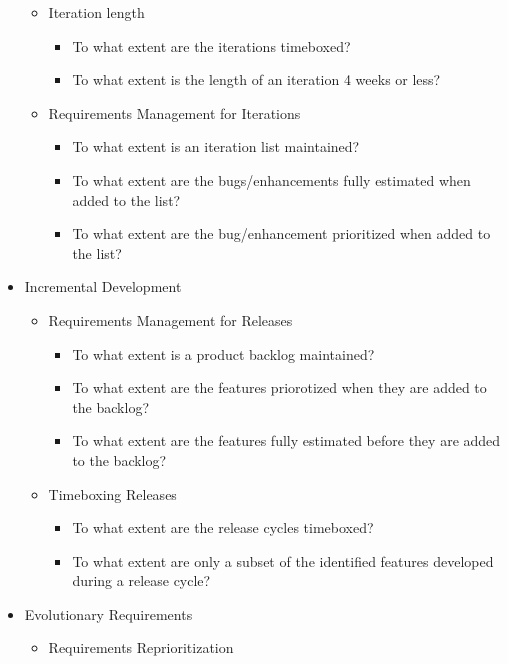 \begin{appendices}
\begin{itemize}
\begin{itemize}
			\item Iteration length
				\begin{itemize}
					\item To what extent are the iterations timeboxed?
					\item To what extent is the length of an iteration 4 weeks or less?
				\end{itemize}
			\item Requirements Management for Iterations
				\begin{itemize}
					\item To what extent is an iteration list maintained?
					\item To what extent are the bugs/enhancements fully estimated when added to the list?
					\item To what extent are the bug/enhancement prioritized when added to the list?
				\end{itemize}
		\end{itemize}
	\item Incremental Development
		\begin{itemize}
			\item Requirements Management for Releases
				\begin{itemize}
					\item To what extent is a product backlog maintained?
					\item To what extent are the features priorotized when they are added to the backlog?
					\item To what extent are the features fully estimated before they are added to the backlog?
				\end{itemize}
			\item Timeboxing Releases
				\begin{itemize}
					\item To what extent are the release cycles timeboxed?
					\item To what extent are only a subset of the identified features developed during a release cycle?
				\end{itemize}
		\end{itemize}
	\item Evolutionary Requirements
		\begin{itemize}
			\item Requirements Reprioritization 
				\begin{itemize}

\end{itemize}
\end{itemize}
\end{itemize}
\end{appendices}
